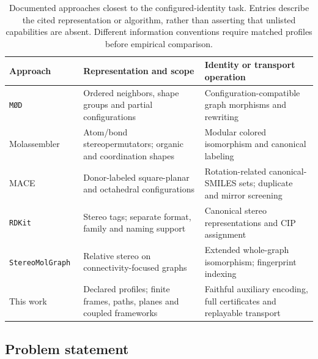 \documentclass[pdflatex,sn-mathphys-num,referee,lineno]{sn-jnl}
\newcommand{\rdkit}{\texttt{RDKit}\xspace}
\newcommand{\modfw}{\texttt{M\O D}\xspace}
\newcommand{\stereomolgraph}{\texttt{StereoMolGraph}\xspace}
\theoremstyle{plain}
\theoremstyle{remark}
\theoremstyle{definition}
\begin{document}
\begin{table}[htbp]
\caption{Documented approaches closest to the configured-identity task.
Entries describe the cited representation or algorithm, rather than asserting
that unlisted capabilities are absent.  Different information conventions
require matched profiles before empirical comparison.}
\label{tab:frameworks}
\centering
\small
\begin{tabularx}{\textwidth}{@{}lXX@{}}
\toprule
Approach & Representation and scope & Identity or transport operation \\
\midrule
\modfw~\cite{andersen2017stereo}
 & Ordered neighbors, shape groups and partial configurations
 & Configuration-compatible graph morphisms and rewriting \\
Molassembler~\cite{sobez2020molassembler}
 & Atom/bond stereopermutators; organic and coordination shapes
 & Modular colored isomorphism and canonical labeling \\
MACE~\cite{chernyshov2024mace}
 & Donor-labeled square-planar and octahedral configurations
 & Rotation-related canonical-SMILES sets; duplicate and mirror screening \\
\rdkit~\cite{rdkitstereobook}
 & Stereo tags; separate format, family and naming support
 & Canonical stereo representations and CIP assignment \\
\stereomolgraph~\cite{papusha2026stereomolgraph,stereomolgraphsource}
 & Relative stereo on connectivity-focused graphs
 & Extended whole-graph isomorphism; fingerprint indexing \\
This work
 & Declared profiles; finite frames, paths, planes and coupled frameworks
 & Faithful auxiliary encoding, full certificates and replayable transport \\
\bottomrule
\end{tabularx}
\end{table}

\subsection{Problem statement}
\label{sec:remaining-problem}
\end{document}
